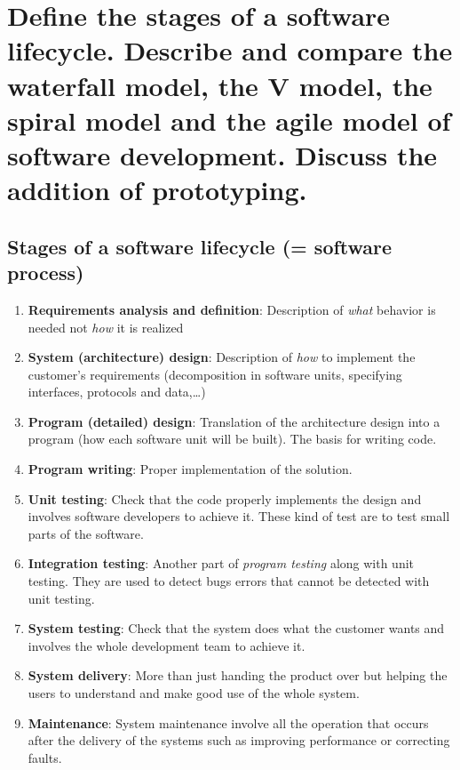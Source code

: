 \clearpage{}

\section{Define the stages of a software lifecycle. Describe and compare the
waterfall model, the V model, the spiral model and the agile model of
software development. Discuss the addition of prototyping.}

\subsection{Stages of a software lifecycle (= software process)}

\begin{enumerate}
    \item \textbf{Requirements analysis and definition}: Description of \textit{what}
        behavior is needed not \textit{how} it is realized
    \item \textbf{System (architecture) design}: Description of \textit{how} to implement the customer's requirements (decomposition in software units, specifying interfaces, protocols and data,\ldots)
    \item \textbf{Program (detailed) design}:
     Translation of the architecture design into a program (how each software unit will be built). The basis for writing code.
    \item \textbf{Program writing}:
     Proper implementation of the solution.
    \item \textbf{Unit testing}:
     Check that the code properly implements the design and involves software developers to achieve it.
     These kind of test are to test small parts of the software.
    \item \textbf{Integration testing}:
     Another part of \textit{program testing} along with unit testing. They are used to detect bugs
     errors that cannot be detected with unit testing.
    \item \textbf{System testing}:
    Check that the system does what the customer wants and involves the whole development team to achieve it.
    \item \textbf{System delivery}:
     More than just handing the product over but helping the users to understand and make good use of the whole system.
    \item \textbf{Maintenance}:
    System maintenance involve all the operation that occurs after the delivery of the systems such as 
    improving performance or correcting faults.
\end{enumerate}

